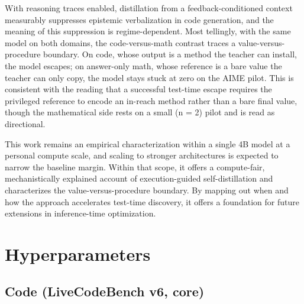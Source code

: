 \documentclass[12pt,a4paper]{report}
\begin{document}
With reasoning traces enabled, distillation from a feedback-conditioned context measurably suppresses epistemic verbalization in code generation, and the meaning of this suppression is regime-dependent. Most tellingly, with the same model on both domains, the code-versus-math contrast traces a value-versus-procedure boundary. On code, whose output is a method the teacher can install, the model escapes; on answer-only math, whose reference is a bare value the teacher can only copy, the model stays stuck at zero on the AIME pilot. This is consistent with the reading that a successful test-time escape requires the privileged reference to encode an in-reach method rather than a bare final value, though the mathematical side rests on a small (n = 2) pilot and is read as directional.

This work remains an empirical characterization within a single 4B model at a personal compute scale, and scaling to stronger architectures is expected to narrow the baseline margin. Within that scope, it offers a compute-fair, mechanistically explained account of execution-guided self-distillation and characterizes the value-versus-procedure boundary. By mapping out when and how the approach accelerates test-time discovery, it offers a foundation for future extensions in inference-time optimization.


\clearpage
{}
{}
\renewcommand{\bibname}{References}




\appendix
\chapter{Hyperparameters}\label{appendix-a-hyperparameters}

\section{Code (LiveCodeBench v6, core)}\label{a.1-code-livecodebench-v6-core}
\end{document}
